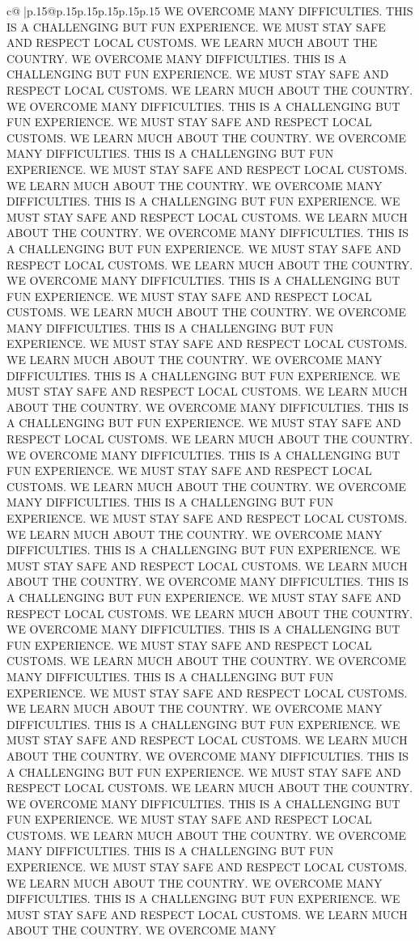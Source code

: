 \documentclass{article}
\begin{document}
{\begin{supertabular}{c@{$\;$}|p{.15\linewidth}@{}p{.15\linewidth}p{.15\linewidth}p{.15\linewidth}p{.15\linewidth}p{.15\linewidth}}
{{{WE OVERCOME MANY DIFFICULTIES. THIS IS A CHALLENGING BUT FUN EXPERIENCE. WE MUST STAY SAFE AND RESPECT LOCAL CUSTOMS. WE LEARN MUCH ABOUT THE COUNTRY. WE OVERCOME MANY DIFFICULTIES. THIS IS A CHALLENGING BUT FUN EXPERIENCE. WE MUST STAY SAFE AND RESPECT LOCAL CUSTOMS. WE LEARN MUCH ABOUT THE COUNTRY. WE OVERCOME MANY DIFFICULTIES. THIS IS A CHALLENGING BUT FUN EXPERIENCE. WE MUST STAY SAFE AND RESPECT LOCAL CUSTOMS. WE LEARN MUCH ABOUT THE COUNTRY. WE OVERCOME MANY DIFFICULTIES. THIS IS A CHALLENGING BUT FUN EXPERIENCE. WE MUST STAY SAFE AND RESPECT LOCAL CUSTOMS. WE LEARN MUCH ABOUT THE COUNTRY. WE OVERCOME MANY DIFFICULTIES. THIS IS A CHALLENGING BUT FUN EXPERIENCE. WE MUST STAY SAFE AND RESPECT LOCAL CUSTOMS. WE LEARN MUCH ABOUT THE COUNTRY. WE OVERCOME MANY DIFFICULTIES. THIS IS A CHALLENGING BUT FUN EXPERIENCE. WE MUST STAY SAFE AND RESPECT LOCAL CUSTOMS. WE LEARN MUCH ABOUT THE COUNTRY. WE OVERCOME MANY DIFFICULTIES. THIS IS A CHALLENGING BUT FUN EXPERIENCE. WE MUST STAY SAFE AND RESPECT LOCAL CUSTOMS. WE LEARN MUCH ABOUT THE COUNTRY. WE OVERCOME MANY DIFFICULTIES. THIS IS A CHALLENGING BUT FUN EXPERIENCE. WE MUST STAY SAFE AND RESPECT LOCAL CUSTOMS. WE LEARN MUCH ABOUT THE COUNTRY. WE OVERCOME MANY DIFFICULTIES. THIS IS A CHALLENGING BUT FUN EXPERIENCE. WE MUST STAY SAFE AND RESPECT LOCAL CUSTOMS. WE LEARN MUCH ABOUT THE COUNTRY. WE OVERCOME MANY DIFFICULTIES. THIS IS A CHALLENGING BUT FUN EXPERIENCE. WE MUST STAY SAFE AND RESPECT LOCAL CUSTOMS. WE LEARN MUCH ABOUT THE COUNTRY. WE OVERCOME MANY DIFFICULTIES. THIS IS A CHALLENGING BUT FUN EXPERIENCE. WE MUST STAY SAFE AND RESPECT LOCAL CUSTOMS. WE LEARN MUCH ABOUT THE COUNTRY. WE OVERCOME MANY DIFFICULTIES. THIS IS A CHALLENGING BUT FUN EXPERIENCE. WE MUST STAY SAFE AND RESPECT LOCAL CUSTOMS. WE LEARN MUCH ABOUT THE COUNTRY. WE OVERCOME MANY DIFFICULTIES. THIS IS A CHALLENGING BUT FUN EXPERIENCE. WE MUST STAY SAFE AND RESPECT LOCAL CUSTOMS. WE LEARN MUCH ABOUT THE COUNTRY. WE OVERCOME MANY DIFFICULTIES. THIS IS A CHALLENGING BUT FUN EXPERIENCE. WE MUST STAY SAFE AND RESPECT LOCAL CUSTOMS. WE LEARN MUCH ABOUT THE COUNTRY. WE OVERCOME MANY DIFFICULTIES. THIS IS A CHALLENGING BUT FUN EXPERIENCE. WE MUST STAY SAFE AND RESPECT LOCAL CUSTOMS. WE LEARN MUCH ABOUT THE COUNTRY. WE OVERCOME MANY DIFFICULTIES. THIS IS A CHALLENGING BUT FUN EXPERIENCE. WE MUST STAY SAFE AND RESPECT LOCAL CUSTOMS. WE LEARN MUCH ABOUT THE COUNTRY. WE OVERCOME MANY DIFFICULTIES. THIS IS A CHALLENGING BUT FUN EXPERIENCE. WE MUST STAY SAFE AND RESPECT LOCAL CUSTOMS. WE LEARN MUCH ABOUT THE COUNTRY. WE OVERCOME MANY DIFFICULTIES. THIS IS A CHALLENGING BUT FUN EXPERIENCE. WE MUST STAY SAFE AND RESPECT LOCAL CUSTOMS. WE LEARN MUCH ABOUT THE COUNTRY. WE OVERCOME MANY DIFFICULTIES. THIS IS A CHALLENGING BUT FUN EXPERIENCE. WE MUST STAY SAFE AND RESPECT LOCAL CUSTOMS. WE LEARN MUCH ABOUT THE COUNTRY. WE OVERCOME MANY DIFFICULTIES. THIS IS A CHALLENGING BUT FUN EXPERIENCE. WE MUST STAY SAFE AND RESPECT LOCAL CUSTOMS. WE LEARN MUCH ABOUT THE COUNTRY. WE OVERCOME MANY DIFFICULTIES. THIS IS A CHALLENGING BUT FUN EXPERIENCE. WE MUST STAY SAFE AND RESPECT LOCAL CUSTOMS. WE LEARN MUCH ABOUT THE COUNTRY. WE OVERCOME MANY }}}
\end{supertabular}}
\end{document}

